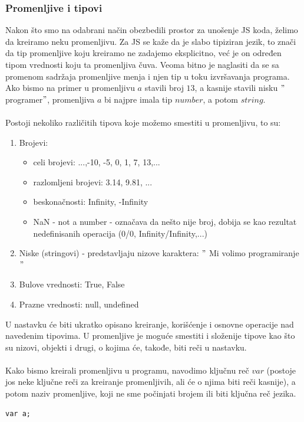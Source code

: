 \documentclass[a4paper]{article}
\begin{document}
\subsubsection{Promenljive i tipovi}
Nakon što smo na odabrani način obezbedili prostor za unošenje JS koda, želimo da kreiramo neku promenljivu. Za JS se kaže da je slabo tipiziran jezik, to znači da tip promenljive koju kreiramo ne zadajemo eksplicitno, već je on određen tipom vrednosti koju ta promenljiva čuva. Veoma bitno je naglasiti da se sa promenom sadržaja promenljive menja i njen tip u toku izvršavanja programa. Ako bismo na primer u promenljivu $a$ stavili broj $13$, a kasnije stavili nisku $"$programer$"$, promenljiva $a$ bi najpre imala tip $number$, a potom $string$.\\\\
Postoji nekoliko različitih tipova koje možemo smestiti u promenljivu, to su:
\begin{enumerate}
    \item Brojevi: 
    \begin{itemize}
        \item celi brojevi: ...,-10, -5, 0, 1, 7, 13,...
        \item razlomljeni brojevi: 3.14, 9.81, ...
        \item beskonačnosti: Infinity, -Infinity
        \item NaN - not a number - označava da nešto nije broj, dobija se kao rezultat nedefinisanih operacija (0/0, Infinity/Infinity,...) 
    \end{itemize}
    \item Niske (stringovi) - predstavljaju nizove karaktera: $"$ Mi volimo programiranje $"$
    \item Bulove vrednosti: True, False
    \item Prazne vrednosti: null, undefined
\end{enumerate}
U nastavku će biti ukratko opisano kreiranje, korišćenje i osnovne operacije nad navedenim tipovima. U promenljive je moguće smestiti i složenije tipove kao što su nizovi, objekti i drugi, o kojima će, takođe, biti reči u nastavku.\\\\
Kako bismo kreirali promenljivu u programu, navodimo ključnu reč $var$ (postoje jos neke ključne reči za kreiranje promenljivih, ali će o njima biti reči kasnije), a potom naziv promenljive, koji ne sme počinjati brojem ili biti ključna reč jezika.
\begin{lstlisting}[backgroundcolor = \color{lightgray}]
var a;
\end{lstlisting}
\end{document}

